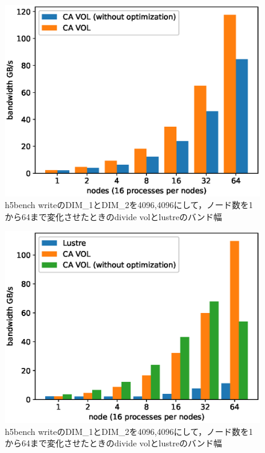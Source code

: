 \documentclass[submit,techrep,noauthor]{ipsj}
\begin{document}
\begin{figure}[t]
	\centering
	\includegraphics[width=\linewidth]{figure/chfs_strided.eps}
	\caption{h5bench writeのDIM\_1とDIM\_2を4096,4096にして，ノード数を1から64まで変化させたときのdivide volとlustreのバンド幅}
	\label{fig:h5writechfslustre}
\end{figure}


\begin{figure}[t]
	\centering
	\includegraphics[width=\linewidth]{figure/segmented_chfs.eps}
	\caption{h5bench writeのDIM\_1とDIM\_2を4096,4096にして，ノード数を1から64まで変化させたときのdivide volとlustreのバンド幅}
	\label{fig:h5writechfslustre}
\end{figure}
\end{document}
